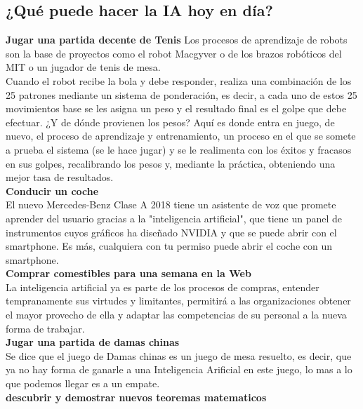 \documentclass[12pt,a4paper]{report}
\begin{document}
\subsection*{¿Qué puede hacer la IA hoy en día?}
\textbf{Jugar una partida decente de Tenis}
Los procesos de aprendizaje de robots son la base de proyectos como el robot Macgyver o de los brazos robóticos del MIT o un jugador de tenis de mesa.\\
Cuando el robot recibe la bola y debe responder, realiza una combinación de los 25 patrones mediante un sistema de ponderación, es decir, a cada uno de estos 25 movimientos base se les asigna un peso y el resultado final es el golpe que debe efectuar. ¿Y de dónde provienen los pesos? Aquí es donde entra en juego, de nuevo, el proceso de aprendizaje y entrenamiento, un proceso en el que se somete a prueba el sistema (se le hace jugar) y se le realimenta con los éxitos y fracasos en sus golpes, recalibrando los pesos y, mediante la práctica, obteniendo una mejor tasa de resultados.
\\\textbf{Conducir un coche}\\
El nuevo Mercedes-Benz Clase A 2018 tiene un asistente de voz que promete aprender del usuario gracias a la "inteligencia artificial", que tiene un panel de instrumentos cuyos gráficos ha diseñado NVIDIA y que se puede abrir con el smartphone. Es más, cualquiera con tu permiso puede abrir el coche con un smartphone.
\\\textbf{Comprar comestibles para una semana en la Web}
\\La inteligencia artificial ya es parte de los procesos de compras, entender tempranamente sus virtudes y limitantes, permitirá a las organizaciones obtener el mayor provecho de ella y adaptar las competencias de su personal a la nueva forma de trabajar.
 \\\textbf{Jugar una partida de damas chinas}
 \\Se dice que el juego de Damas chinas es un juego de mesa resuelto, es decir, que ya no hay forma de ganarle a una Inteligencia Arificial en este juego, lo mas a lo que podemos llegar es a un empate.
 \\\textbf{descubrir y demostrar nuevos teoremas matematicos}
\end{document}

